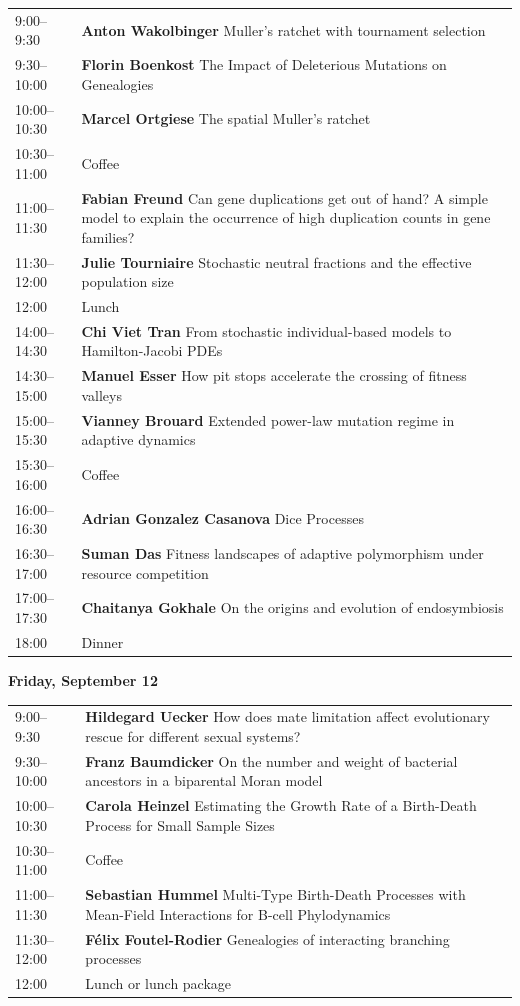 \documentclass[12pt,a4paper]{article}
\begin{document}
\begin{tabular}{@{}l p{}@{}}
9:00--9:30 &\textbf{Anton Wakolbinger } Muller's ratchet with tournament selection \\
9:30--10:00 &\textbf{Florin Boenkost } The Impact of Deleterious Mutations on Genealogies \\
10:00--10:30 &\textbf{Marcel Ortgiese } The spatial Muller's ratchet \\
10:30--11:00 & Coffee \\
11:00--11:30 &\textbf{Fabian Freund } Can gene duplications get out of hand? A simple model to explain the occurrence of high duplication counts in gene families? \\
11:30--12:00 &\textbf{Julie Tourniaire } Stochastic neutral fractions and the effective population size \\
12:00 & Lunch \\
14:00--14:30 &\textbf{Chi Viet Tran } From stochastic individual-based models to Hamilton-Jacobi PDEs \\
14:30--15:00 &\textbf{Manuel Esser } How pit stops accelerate the crossing of fitness valleys \\
15:00--15:30 &\textbf{Vianney Brouard } Extended power-law mutation regime in adaptive dynamics \\
15:30--16:00 & Coffee \\
16:00--16:30 &\textbf{Adrian Gonzalez Casanova } Dice Processes \\
16:30--17:00 &\textbf{Suman Das } Fitness landscapes of adaptive polymorphism under resource competition \\
17:00--17:30 &\textbf{Chaitanya Gokhale } On the origins and evolution of endosymbiosis \\
18:00 & Dinner \\
\end{tabular}

\newpage
\textbf{\Large Friday, September 12}\medskip

\begin{tabular}{@{}l p{}@{}}
9:00--9:30 &\textbf{Hildegard Uecker } How does mate limitation affect evolutionary rescue for different sexual systems? \\
9:30--10:00 &\textbf{Franz Baumdicker } On the number and weight of bacterial ancestors in a biparental Moran model \\
10:00--10:30 &\textbf{Carola Heinzel } Estimating the Growth Rate of a Birth-Death Process for Small Sample Sizes \\
10:30--11:00 & Coffee \\
11:00--11:30 &\textbf{Sebastian Hummel } Multi-Type Birth-Death Processes with Mean-Field Interactions for B-cell Phylodynamics \\
11:30--12:00 &\textbf{Félix Foutel-Rodier } Genealogies of interacting branching processes \\
12:00 & Lunch or lunch package \\
\end{tabular}
\end{document}

